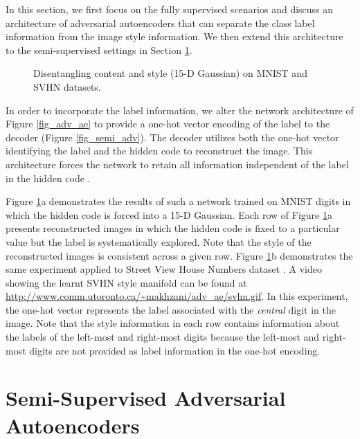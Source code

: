 \documentclass{article}
\begin{document}
In this section, we first focus on the fully supervised scenarios and discuss an architecture of adversarial autoencoders that can separate the class label information from the image style information. We then extend this architecture to the semi-supervised settings in Section \ref{sec:semi-supervised}.



\begin{figure}[b]
\centering
{}
\caption{\label{fig_disentangle}Disentangling content and style (15-D Gaussian) on MNIST and SVHN datasets.}
\end{figure}


In order to incorporate the label information, we alter the network architecture of Figure \ref{fig_adv_ae} to provide a one-hot vector encoding of the label to the decoder (Figure \ref{fig_semi_adv}).
The decoder utilizes both the one-hot vector identifying the label and the hidden code  to reconstruct the image.
This architecture forces the network to retain all information independent of the label in the hidden code . 



Figure \ref{fig_disentangle}a demonstrates the results of such a network trained on MNIST digits in which the hidden code is forced into a 15-D Gaussian.
Each row of Figure \ref{fig_disentangle}a presents reconstructed images in which the hidden code  is fixed to a particular value but the label is systematically explored.
Note that the style of the reconstructed images is consistent across a given row.
Figure \ref{fig_disentangle}b demonstrates the same experiment applied to Street View House Numbers dataset \citep{svhn}. A video showing the learnt SVHN style manifold can be found at \url{http://www.comm.utoronto.ca/~makhzani/adv_ae/svhn.gif}.
In this experiment, the one-hot vector represents the label associated with the \textit{central} digit in the image.
Note that the style information in each row contains information about the labels of the left-most and right-most digits because the left-most and right-most digits are not provided as label information in the one-hot encoding.


\section{Semi-Supervised Adversarial Autoencoders}\label{sec:semi-supervised}
\end{document}
